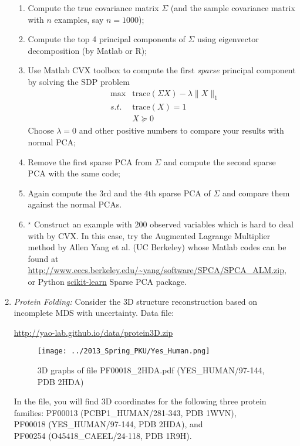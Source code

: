 \documentclass[11pt]{article}
\def\tr{{\mathrm{trace}}}
\begin{document}
\begin{enumerate}
\begin{enumerate}
\item Compute the true covariance matrix $\Sigma$ (and the sample covariance matrix with $n$ examples, say $n=1000$);
\item Compute the top 4 principal components of $\Sigma$ using eigenvector decomposition (by Matlab or R);
\item Use Matlab CVX toolbox to compute the first \emph{sparse} principal component by solving the SDP problem
\begin{eqnarray*}
& \max & \tr (\Sigma X) - \lambda \|X\|_1 \\
 & s.t. & \tr (X) = 1 \\
 & & X \succeq 0
\end{eqnarray*}
Choose $\lambda =0$ and other positive numbers to compare your results with normal PCA;  

\item Remove the first sparse PCA from $\Sigma$ and compute the second sparse PCA with the same code;
\item Again compute the 3rd and the 4th sparse PCA of $\Sigma$ and compare them against the normal PCAs.  
\item $^\star$ Construct an example with $200$ observed variables which is hard to deal with by CVX. 
In this case, try the Augmented Lagrange Multiplier method by Allen Yang et al. (UC Berkeley) whose Matlab codes can be found at 
\url{http://www.eecs.berkeley.edu/~yang/software/SPCA/SPCA_ALM.zip}, or Python \url{scikit-learn} Sparse PCA package. 
\end{enumerate}

\item{\em Protein Folding:} Consider the 3D structure reconstruction based on incomplete MDS with uncertainty. Data file: 

\url{http://yao-lab.github.io/data/protein3D.zip}

\begin{figure}[htbp]
\begin{center}
\texttt{[image: ../2013\_Spring\_PKU/Yes\_Human.png]}  
\caption{3D graphs of file PF00018\_2HDA.pdf (YES\_HUMAN/97-144, PDB 2HDA)}
\label{yes_human}
\end{center}
\end{figure}

\noindent In the file, you will find 3D coordinates for the following three protein families: 
\subitem PF00013 (PCBP1\_HUMAN/281-343, PDB 1WVN), \\
\subitem PF00018 (YES\_HUMAN/97-144, PDB 2HDA), and \\
\subitem PF00254 (O45418\_CAEEL/24-118, PDB 1R9H). \\


\end{enumerate}
\end{document}
